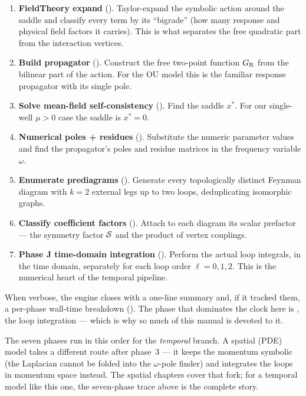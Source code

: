 \begin{enumerate}
  \item[{[1/7]}] \textbf{FieldTheory expand}
        (). Taylor-expand the symbolic action
        around the saddle and classify every term by its ``bigrade'' (how many
        response and physical field factors it carries). This is what separates
        the free quadratic part from the interaction vertices.
  \item[{[2/7]}] \textbf{Build propagator}
        (). Construct the free two-point function
        $G_{\mathrm R}$ from the bilinear part of the action. For the OU model this is
        the familiar response propagator with its single pole.
  \item[{[3/7]}] \textbf{Solve mean-field self-consistency}
        (). Find the saddle $x^{*}$. For our
        single-well $\mu > 0$ case the saddle is $x^{*} = 0$.
  \item[{[4/7]}] \textbf{Numerical poles + residues}
        (). Substitute the numeric parameter
        values and find the propagator's poles and residue matrices in the
        frequency variable $\omega$.
  \item[{[5/7]}] \textbf{Enumerate prediagrams}
        (). Generate every topologically distinct
        Feynman diagram with $k=2$ external legs up to two loops, deduplicating
        isomorphic graphs.
  \item[{[6/7]}] \textbf{Classify coefficient factors}
        (). Attach to each diagram its scalar
        prefactor --- the symmetry factor $\mathcal{S}$ and the product of vertex
        couplings.
  \item[{[7/7]}] \textbf{Phase J time-domain integration}
        (). Perform the actual loop integrals, in
        the time domain, separately for each loop order $\ell = 0, 1, 2$. This is
        the numerical heart of the temporal pipeline.
\end{enumerate}

When verbose, the engine closes with a one-line  summary and, if it
tracked them, a per-phase wall-time breakdown
(). The phase that dominates the clock here is
\code{[7/7]}, the loop integration --- which is why so much of this manual is
devoted to it.

\begin{note}
The seven phases run in this order for the \emph{temporal} branch. A spatial
(PDE) model takes a different route after phase~3 --- it keeps the momentum
symbolic (the Laplacian cannot be folded into the $\omega$-pole finder) and
integrates the loops in momentum space instead. The spatial chapters cover that
fork; for a temporal model like this one, the seven-phase trace above is the
complete story.
\end{note}

